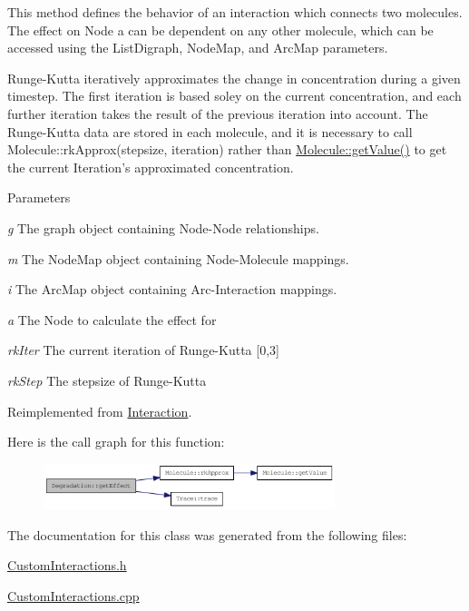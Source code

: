 This method defines the behavior of an interaction which connects two molecules. The effect on Node a can be dependent on any other molecule, which can be accessed using the ListDigraph, NodeMap, and ArcMap parameters.

Runge-\/Kutta iteratively approximates the change in concentration during a given timestep. The first iteration is based soley on the current concentration, and each further iteration takes the result of the previous iteration into account. The Runge-\/Kutta data are stored in each molecule, and it is necessary to call Molecule::rkApprox(stepsize, iteration) rather than \hyperlink{classMolecule_a554ea822918374775d5f52b5d49d8195}{Molecule::getValue()} to get the current Iteration's approximated concentration.


\begin{DoxyParams}{Parameters}
\item[{\em g}]The graph object containing Node-\/Node relationships. \item[{\em m}]The NodeMap object containing Node-\/Molecule mappings. \item[{\em i}]The ArcMap object containing Arc-\/Interaction mappings. \item[{\em a}]The Node to calculate the effect for \item[{\em rkIter}]The current iteration of Runge-\/Kutta \mbox{[}0,3\mbox{]} \item[{\em rkStep}]The stepsize of Runge-\/Kutta \end{DoxyParams}


Reimplemented from \hyperlink{classInteraction_a6328831e714adf9c8177f6052d2e017f}{Interaction}.

Here is the call graph for this function:\nopagebreak
\begin{figure}[H]
\begin{center}
\leavevmode
\includegraphics[width=241pt]{classDegradation_a3cad4fc84026c6f627306a7e35527f3c_cgraph}
\end{center}
\end{figure}


The documentation for this class was generated from the following files:\begin{DoxyCompactItemize}
\item 
\hyperlink{CustomInteractions_8h}{CustomInteractions.h}\item 
\hyperlink{CustomInteractions_8cpp}{CustomInteractions.cpp}\end{DoxyCompactItemize}
